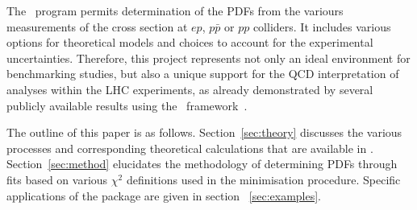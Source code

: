 
The \fitter\ program permits determination of the PDFs from the variours measurements of the cross section at $ep$, $p\bar{p}$ or $pp$ colliders.  
 It includes various options for theoretical models and choices to account for the experimental uncertainties. Therefore, this project represents not only an ideal environment for benchmarking studies, but also a unique support for the QCD interpretation of analyses within the LHC experiments,
as already demonstrated by several publicly available results using the \fitter\ 
framework~\cite{atlas:strange, jets, hm}.  

The outline of this paper is as follows.
%
Section~\ref{sec:theory} discusses the various processes 
and corresponding theoretical calculations 
that are available in \fitter.
%
Section~\ref{sec:method} elucidates the 
methodology of determining PDFs through fits based on various
 $\chi^2$ definitions used in the
minimisation procedure.
%
Specific applications of the package are given in
section ~\ref{sec:examples}. 
%
